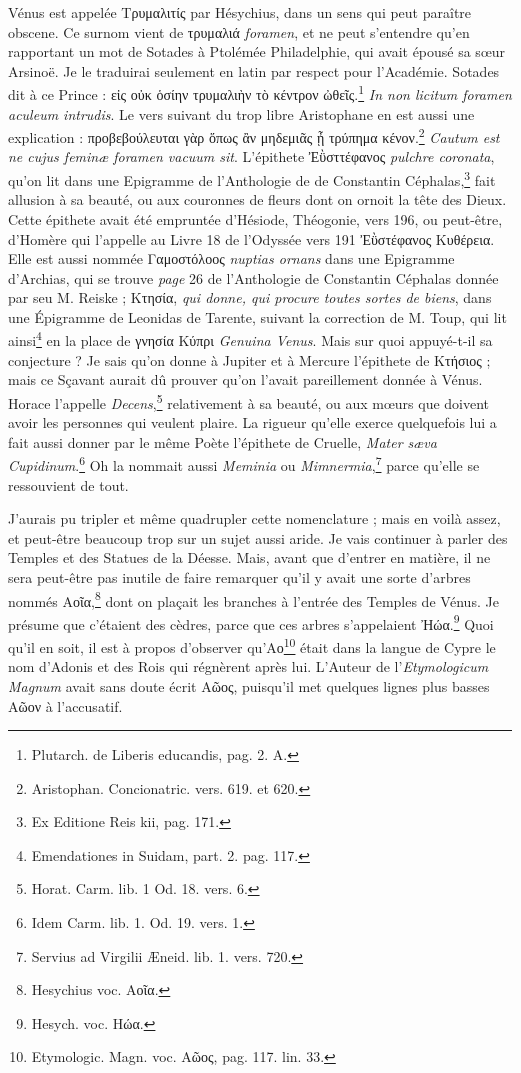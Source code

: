 \documentclass[a4paper, 11pt, oneside, polutonikogreek, french]{article}
\begin{document}
Vénus est appelée Τρυμαλιτίς par Hésychius, dans un sens qui peut paraître obscene. Ce surnom vient de τρυμαλιά \emph{foramen}, et ne peut s'entendre qu'en rapportant un mot de Sotades à Ptolémée Philadelphie, qui avait épousé sa sœur Arsinoë. Je le traduirai seulement en latin par respect pour l'Académie. Sotades dit à ce Prince : εἰς οὐκ ὁσίην τρυμαλιὴν τὸ κέντρον ὠθεῖς.\footnote{Plutarch. de Liberis educandis, pag. 2. A.} \emph{In non licitum foramen aculeum intrudis}. Le vers suivant du trop libre Aristophane en est aussi une explication : προβεβούλευται γὰρ ὅπως ἂν μηδεμιᾶς ᾖ τρύπημα κένον.\footnote{Aristophan. Concionatric. vers. 619. et 620.} \emph{Cautum est ne cujus feminæ foramen vacuum sit}. L'épithete Ἐῢσττέφανος \emph{pulchre coronata}, qu'on lit dans une Epigramme de l'Anthologie de de Constantin Céphalas,\footnote{Ex Editione Reis kii, pag. 171.} fait allusion à sa beauté, ou aux couronnes de fleurs dont on ornoit la tête des Dieux. Cette épithete avait été empruntée d'Hésiode, Théogonie, vers 196, ou peut-être, d'Homère qui l'appelle au Livre 18 de l'Odyssée vers 191 Ἐῢστέφανος Κυθέρεια. Elle est aussi nommée Γαμοστόλοος \emph{nuptias ornans} dans une Epigramme d'Archias, qui se trouve \emph{page} 26 de l'Anthologie de Constantin Céphalas donnée par seu M. Reiske ; Κτησία, \emph{qui donne, qui procure toutes sortes de biens}, dans une Épigramme de Leonidas de Tarente, suivant la correction de M. Toup, qui lit ainsi\footnote{Emendationes in Suidam, part. 2. pag. 117.} en la place de γνησία Κύπρι \emph{Genuina Venus}. Mais sur quoi appuyé-t-il sa conjecture ? Je sais qu'on donne à Jupiter et à Mercure l'épithete de Κτήσιος ; mais ce Sçavant aurait dû prouver qu'on l'avait pareillement donnée à Vénus. Horace l'appelle \emph{Decens},\footnote{Horat. Carm. lib. 1 Od. 18. vers. 6.} relativement à sa beauté, ou aux mœurs que doivent avoir les personnes qui veulent plaire. La rigueur qu'elle exerce quelquefois lui a fait aussi donner par le même Poète l'épithete de Cruelle, \emph{Mater sæva Cupidinum}.\footnote{Idem Carm. lib. 1. Od. 19. vers. 1.} Oh la nommait aussi \emph{Meminia} ou \emph{Mimnermia},\footnote{Servius ad Virgilii Æneid. lib. 1. vers. 720.} parce qu'elle se ressouvient de tout.

J'aurais pu tripler et même quadrupler cette nomenclature ; mais en voilà assez, et peut-être beaucoup trop sur un sujet aussi aride. Je vais continuer à parler des Temples et des Statues de la Déesse. Mais, avant que d'entrer en matière, il ne sera peut-être pas inutile de faire remarquer qu'il y avait une sorte d'arbres nommés Αοῖα,\footnote{Hesychius voc. Αοῖα.} dont on plaçait les branches à l'entrée des Temples de Vénus. Je présume que c'étaient des cèdres, parce que ces arbres s'appelaient Ἠώα.\footnote{Hesych. voc. Ηώα.} Quoi qu'il en soit, il est à propos d'observer qu'Αο\footnote{Etymologic. Magn. voc. Αῶος, pag. 117. lin. 33.} était dans la langue de Cypre le nom d'Adonis et des Rois qui régnèrent après lui. L'Auteur de l'\emph{Etymologicum Magnum} avait sans doute écrit Αῶος, puisqu'il met quelques lignes plus basses Αῶον à l'accusatif.
\end{document}

